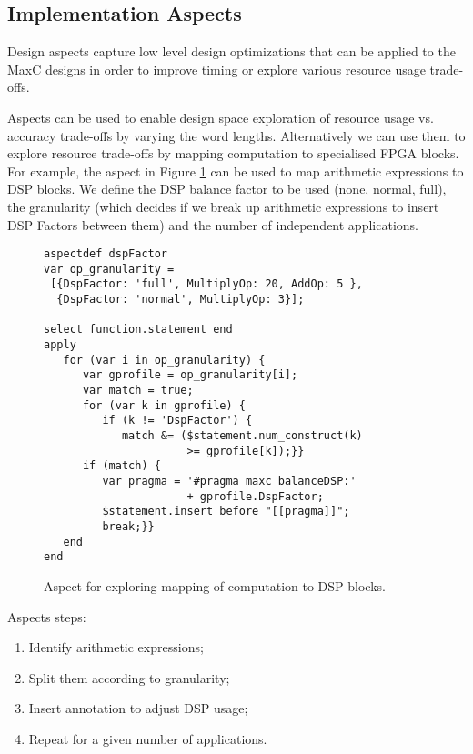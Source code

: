 \subsection{Implementation Aspects}

Design aspects capture low level design optimizations that can be
applied to the MaxC designs in order to improve timing or explore
various resource usage trade-offs.

Aspects can be used to enable design space exploration of resource
usage vs. accuracy trade-offs by varying the word
lengths. Alternatively we can use them to explore resource trade-offs
by mapping computation to specialised FPGA blocks. For example, the
aspect in Figure \ref{fig:aspect-DSP} can be used to map arithmetic
expressions to DSP blocks. We define the DSP balance factor to be used
(none, normal, full), the granularity (which decides if we break up
arithmetic expressions to insert DSP Factors between them) and the
number of independent applications.

\lstset{style=lara}
\begin{figure}[!h]
  \centering
  \begin{lstlisting}
aspectdef dspFactor
var op_granularity =
 [{DspFactor: 'full', MultiplyOp: 20, AddOp: 5 },
  {DspFactor: 'normal', MultiplyOp: 3}];

select function.statement end
apply
   for (var i in op_granularity) {
      var gprofile = op_granularity[i];
      var match = true;
      for (var k in gprofile) {
         if (k != 'DspFactor') {
            match &= ($statement.num_construct(k)
                      >= gprofile[k]);}}
      if (match) {
         var pragma = '#pragma maxc balanceDSP:'
                      + gprofile.DspFactor;
         $statement.insert before "[[pragma]]";
         break;}}
   end
end
  \end{lstlisting}
  \caption{Aspect for exploring mapping of computation to DSP blocks.}
  \label{fig:aspect-DSP}
\end{figure}

Aspects steps:

\begin{enumerate}
\item Identify arithmetic expressions;
\item Split them according to granularity;
\item Insert annotation to adjust DSP usage;
\item Repeat for a given number of applications.
\end{enumerate}

